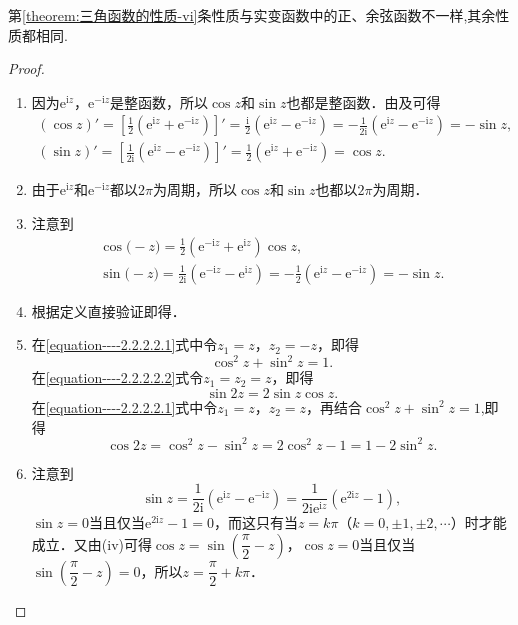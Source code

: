 \documentclass[../../main.tex]{subfiles}%
\begin{document}
\begin{remark}
第\ref{theorem:三角函数的性质-vi}条性质与实变函数中的正、余弦函数不一样,其余性质都相同.
\end{remark}
\begin{proof}
\begin{enumerate}[(1)]
\item 因为$\text{e}^{\text{i}z}$，$\text{e}^{-\text{i}z}$是整函数，所以$\cos z$和$\sin z$也都是整函数．由及可得
\begin{gather*}
(\cos z)' =\left[ \frac{1}{2}\left( \mathrm{e}^{\mathrm{i}z}+\mathrm{e}^{-\mathrm{i}z} \right) \right] ' =\frac{\mathrm{i}}{2}\left( \mathrm{e}^{\mathrm{i}z}-\mathrm{e}^{-\mathrm{i}z} \right) =-\frac{1}{2\mathrm{i}}\left( \mathrm{e}^{\mathrm{i}z}-\mathrm{e}^{-\mathrm{i}z} \right) =-\sin z,
\\
(\sin z)' =\left[ \frac{1}{2\mathrm{i}}\left( \mathrm{e}^{\mathrm{i}z}-\mathrm{e}^{-\mathrm{i}z} \right) \right]'=\frac{1}{2}\left( \mathrm{e}^{\mathrm{i}z}+\mathrm{e}^{-\mathrm{i}z} \right) =\cos z.
\end{gather*}

\item 由于$\text{e}^{\text{i}z}$和$\text{e}^{-\text{i}z}$都以$2\pi$为周期，所以$\cos z$和$\sin z$也都以$2\pi$为周期．

\item 注意到
\begin{gather*}
\cos\mathrm{(}-z)=\frac{1}{2}\left( \mathrm{e}^{-\mathrm{i}z}+\mathrm{e}^{\mathrm{i}z} \right) \cos z,
\\
\sin\mathrm{(}-z)=\frac{1}{2\mathrm{i}}\left( \mathrm{e}^{-\mathrm{i}z}-\mathrm{e}^{\mathrm{i}z} \right) =-\frac{1}{2}\left( \mathrm{e}^{\mathrm{i}z}-\mathrm{e}^{-\mathrm{i}z} \right) =-\sin z.
\end{gather*}

\item 根据定义直接验证即得．

\item 在\eqref{equation----2.2.2.2.1}式中令$z_1 = z$，$z_2 = -z$，即得
\[
\cos^2 z + \sin^2 z = 1.
\]
在\eqref{equation----2.2.2.2.2}式令$z_1 = z_2 = z$，即得
\[
\sin 2z = 2\sin z \cos z.
\]
在\eqref{equation----2.2.2.2.1}式中令$z_1 = z$，$z_2 = z$，再结合$\cos^2 z + \sin^2 z = 1$,即得
\[
\cos 2z=\cos ^2z-\sin ^2z=2\cos ^2z-1=1-2\sin ^2z.
\]

\item 注意到
\[
\sin z = \dfrac{1}{2\text{i}}(\text{e}^{\text{i}z} - \text{e}^{-\text{i}z})
= \dfrac{1}{2\text{i}\text{e}^{\text{i}z}}(\text{e}^{2\text{i}z} - 1),
\]
$\sin z = 0$当且仅当$\text{e}^{2\text{i}z} - 1 = 0$，而这只有当$z = k\pi$（$k = 0, \pm 1, \pm 2, \cdots$）时才能成立．又由(iv)可得$\cos z = \sin\left( \dfrac{\pi}{2} - z \right)$，$\cos z = 0$当且仅当$\sin\left( \dfrac{\pi}{2} - z \right) = 0$，所以$z = \dfrac{\pi}{2} + k\pi$．


\end{enumerate}
\end{proof}
\end{document}
